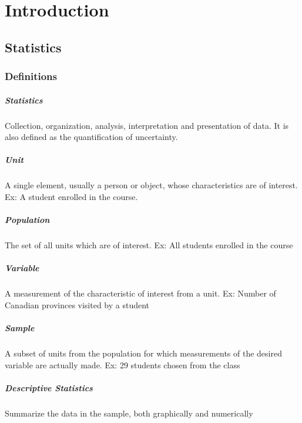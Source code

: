 \chapter{Introduction}
  \section{Statistics}
    \subsection{Definitions}
      \paragraph{Statistics}
      Collection, organization, analysis,
      interpretation and presentation of data. It is also defined as the
      quantification of uncertainty.

      \paragraph{Unit} A single element, usually a person or object, whose
      characteristics are of interest. Ex: A student enrolled in the course.

      \paragraph{Population} The set of all units which are of interest. Ex:
      All students enrolled in the course

      \paragraph{Variable} A measurement of the characteristic of interest
      from a unit. Ex: Number of Canadian provinces visited by a student

      \paragraph{Sample} A subset of units from the population for which
      measurements of the desired variable are actually made. Ex: 29 students
      chosen from the class

      \paragraph{Descriptive Statistics} Summarize the data in the sample, both
      graphically and numerically

